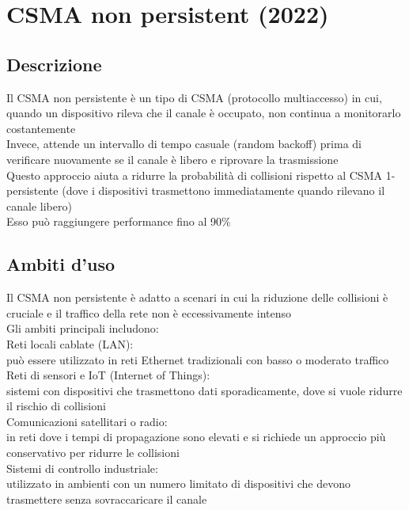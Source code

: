 \documentclass[10pt,oneside,a4paper]{article}
\begin{document}
\section{CSMA non persistent (2022)}
\subsection{Descrizione}
Il CSMA non persistente è un tipo di CSMA (protocollo multiaccesso) in cui, quando un dispositivo rileva che il canale è occupato, non continua a monitorarlo costantemente\\
Invece, attende un intervallo di tempo casuale (random backoff) prima di verificare nuovamente se il canale è libero e riprovare la trasmissione\\
Questo approccio aiuta a ridurre la probabilità di collisioni rispetto al CSMA 1-persistente (dove i dispositivi trasmettono immediatamente quando rilevano il canale libero)\\
Esso può raggiungere performance fino al 90$\%$
\subsection{Ambiti d'uso}
Il CSMA non persistente è adatto a scenari in cui la riduzione delle collisioni è cruciale e il traffico della rete non è eccessivamente intenso\\
Gli ambiti principali includono:\\
Reti locali cablate (LAN):\\
può essere utilizzato in reti Ethernet tradizionali con basso o moderato traffico\\
Reti di sensori e IoT (Internet of Things):\\
sistemi con dispositivi che trasmettono dati sporadicamente, dove si vuole ridurre il rischio di collisioni\\
Comunicazioni satellitari o radio:\\
in reti dove i tempi di propagazione sono elevati e si richiede un approccio più conservativo per ridurre le collisioni\\
Sistemi di controllo industriale:\\
utilizzato in ambienti con un numero limitato di dispositivi che devono trasmettere senza sovraccaricare il canale
\end{document}
